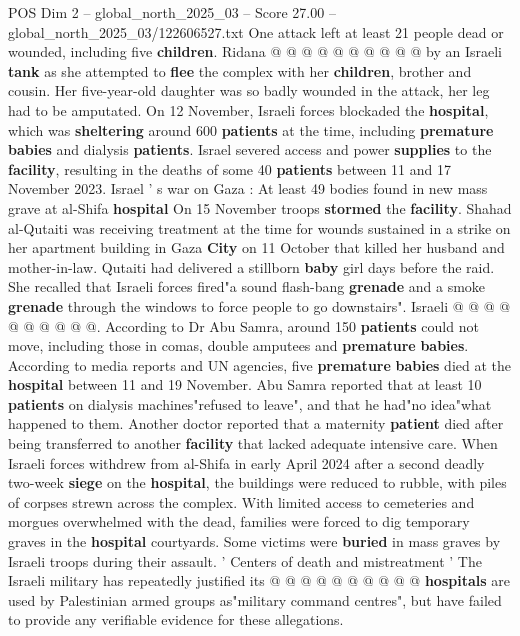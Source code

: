\begin{textsample}{POS Dim 2 – global\_north\_2025\_03 – Score 27.00 – global\_north\_2025\_03/122606527.txt}
One attack left at least 21 people dead or wounded, including five \textbf{children}.
Ridana @ @ @ @ @ @ @ @ @ @ by an Israeli \textbf{tank} as she attempted to \textbf{flee} the complex with her \textbf{children}, brother and cousin.
Her five-year-old daughter was so badly wounded in the attack, her leg had to be amputated.
On 12 November, Israeli forces blockaded the \textbf{hospital}, which was \textbf{sheltering} around 600 \textbf{patients} at the time, including \textbf{premature} \textbf{babies} and dialysis \textbf{patients}.
Israel severed access and power \textbf{supplies} to the \textbf{facility}, resulting in the deaths of some 40 \textbf{patients} between 11 and 17 November 2023.
Israel ' s war on Gaza : At least 49 bodies found in new mass grave at al-Shifa \textbf{hospital} On 15 November troops \textbf{stormed} the \textbf{facility}.
Shahad al-Qutaiti was receiving treatment at the time for wounds sustained in a strike on her apartment building in Gaza \textbf{City} on 11 October that killed her husband and mother-in-law.
Qutaiti had delivered a stillborn \textbf{baby} girl days before the raid.
She recalled that Israeli forces fired"a sound flash-bang \textbf{grenade} and a smoke \textbf{grenade} through the windows to force people to go downstairs".
Israeli @ @ @ @ @ @ @ @ @ @.
According to Dr Abu Samra, around 150 \textbf{patients} could not move, including those in comas, double amputees and \textbf{premature} \textbf{babies}.
According to media reports and UN agencies, five \textbf{premature} \textbf{babies} died at the \textbf{hospital} between 11 and 19 November.
Abu Samra reported that at least 10 \textbf{patients} on dialysis machines"refused to leave", and that he had"no idea"what happened to them.
Another doctor reported that a maternity \textbf{patient} died after being transferred to another \textbf{facility} that lacked adequate intensive care.
When Israeli forces withdrew from al-Shifa in early April 2024 after a second deadly two-week \textbf{siege} on the \textbf{hospital}, the buildings were reduced to rubble, with piles of corpses strewn across the complex.
With limited access to cemeteries and morgues overwhelmed with the dead, families were forced to dig temporary graves in the \textbf{hospital} courtyards.
Some victims were \textbf{buried} in mass graves by Israeli troops during their assault. ' Centers of death and mistreatment ' The Israeli military has repeatedly justified its @ @ @ @ @ @ @ @ @ @ \textbf{hospitals} are used by Palestinian armed groups as"military command centres", but have failed to provide any verifiable evidence for these allegations.

\end{textsample}
